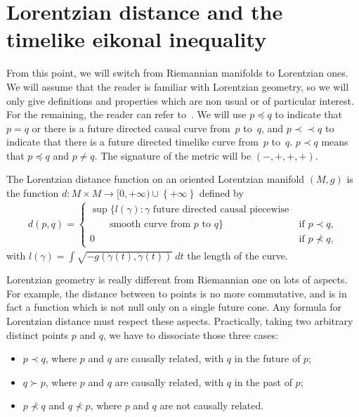 \documentclass[pdftex]{sigma}
\newcommand{\set}[1]{\left\{ {#1} \right\}}
\newcommand{\precc}{\prec\!\!\prec}
\begin{document}
\section{Lorentzian distance and the timelike eikonal inequality}

From this point, we will switch from Riemannian manifolds to Lorentzian ones. We will assume that the reader is familiar with Lorentzian geometry, so we will only give def\/initions and pro\-per\-ties which are non usual or of particular interest. For the remaining, the reader can refer to~\cite{Beem,ONeill}. We will use $p \preceq q$ to indicate that $p = q$ or there is a future directed causal curve from~$p$ to~$q$, and $p \precc q$ to indicate that there is a future directed timelike curve from~$p$ to~$q$. $p \prec q$ means that $p \preceq q$ and $p\neq q$. The signature of the metric will be $(-,+,+,+)$.

\begin{definition}
The Lorentzian distance function on an oriented Lorentzian manifold $(M,g)$ is the function $d : M \times M \rightarrow [0,+\infty) \cup \set{+\infty}$ def\/ined by
\begin{gather*}
d(p,q) =
\begin{cases}
 \sup\{ l(\gamma) : \gamma \text{ future directed causal piecewise} \ & \ \\
  \qquad \text{smooth curve from $p$ to $q$}\} &\text{if } p \prec q,\\
 0 &\text{if } p \nprec q,
\end{cases}
 \end{gather*}
 with $l(\gamma) = \int \sqrt{ -g( \dot\gamma(t) ,  \dot\gamma(t) )}\ dt$ the length of the curve.
\end{definition}

Lorentzian geometry is really dif\/ferent from Riemannian one on lots of aspects. For example, the distance between to points is no more commutative, and is in fact a function which is not null only on a single future cone. Any formula for Lorentzian distance must respect these aspects. Practically, taking two arbitrary distinct points $p$ and $q$, we have to dissociate those three cases:
\begin{itemize}\itemsep=0pt
\item $p \prec q$, where $p$ and $q$ are causally related, with $q$ in the future of $p$;
\item $q \succ p$, where $p$ and $q$ are causally related, with $q$ in the past of $p$;
\item $p \nprec q$ and $q \nprec p$, where $p$ and $q$ are not causally related.
\end{itemize}
\end{document}
